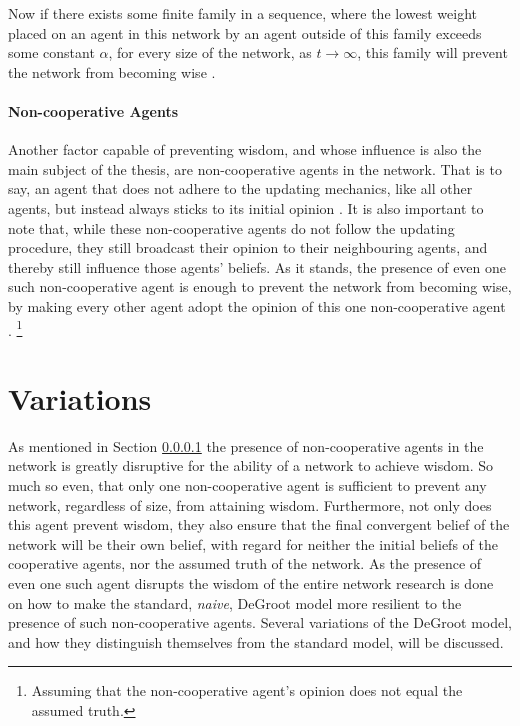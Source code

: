 \documentclass[a4paper, 12pt]{report}
\begin{document}
Now if there exists some finite family in a sequence, where the lowest weight placed on an agent in this network by an agent outside of this family exceeds some constant $\alpha$, for every size of the network, as $t \to \infty$, this family will prevent the network from becoming wise \parencite{golub2010naive}.


\paragraph{Non-cooperative Agents}
\label{theory:noncoop}

Another factor capable of preventing wisdom, and whose influence is also the main subject of the thesis, are non-cooperative agents in the network. That is to say, an agent that does not adhere to the updating mechanics, like all other agents, but instead always sticks to its initial opinion \parencite{amir2021robust}. It is also important to note that, while these non-cooperative agents do not follow the updating procedure, they still broadcast their opinion to their neighbouring agents, and thereby still influence those agents' beliefs. 
As it stands, the presence of even one such non-cooperative agent is enough to prevent the network from becoming wise, by making every other agent adopt the opinion of this one non-cooperative agent \parencite{amir2021robust}. \footnote{Assuming that the non-cooperative agent's opinion does not equal the assumed truth.}

\newpage

\section{Variations}
\label{updating:variations}
As mentioned in Section \ref{theory:noncoop} the presence of non-cooperative agents in the network is greatly disruptive for the ability of a network to achieve wisdom. So much so even, that only one non-cooperative agent is sufficient to prevent any network, regardless of size, from attaining wisdom. Furthermore, not only does this agent prevent wisdom, they also ensure that the final convergent belief of the network will be their own belief, with regard for neither the initial beliefs of the cooperative agents, nor the assumed truth of the network. As the presence of even one such agent disrupts the wisdom of the entire network research is done on how to make the standard, \emph{naive}, DeGroot model more resilient to the presence of such non-cooperative agents. Several variations of the DeGroot model, and how they distinguish themselves from the standard model, will be discussed.
\end{document}
